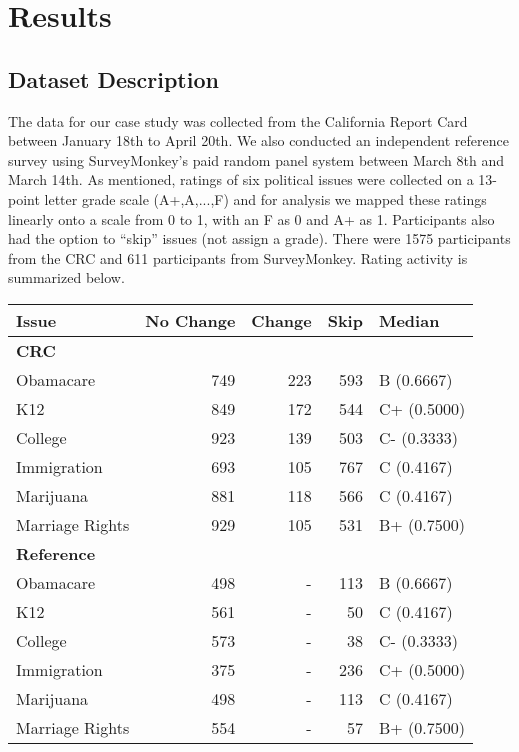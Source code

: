 \section{Results}
\subsection{Dataset Description}
The data for our case study was collected from the California Report Card between January 18th to April 20th.
We also conducted an independent reference survey using SurveyMonkey's paid random panel system between March 8th and March 14th.
As mentioned, ratings of six political issues were collected on a 13-point letter grade scale (A+,A,...,F) and for analysis we 
mapped these ratings linearly onto a scale from 0 to 1, with an F as 0 and A+ as 1.  Participants also had
the option to ``skip'' issues (not assign a grade).
There were 1575 participants from the CRC and 611  participants from SurveyMonkey.  Rating activity is summarized below.

{\centering\scriptsize
\begin{tabular}[!ht]{ l | r | r | r | l }
Issue & No Change & Change & Skip & Median\\
\hline
\hline
  \multicolumn{5}{l}{\textbf{CRC}}\\
  \hline
  Obamacare & 749 & 223 & 593 & B (0.6667) \\
  \hline
  K12 & 849 & 172 & 544 & C+ (0.5000) \\
  \hline
  College & 923 & 139 & 503 & C- (0.3333)\\
  \hline
  Immigration & 693 & 105 & 767 & C (0.4167)\\
  \hline
  Marijuana & 881 & 118 & 566 & C (0.4167) \\
  \hline
  Marriage Rights & 929 & 105 & 531 & B+ (0.7500)\\
\hline
\hline
\multicolumn{5}{l}{\textbf{Reference}}\\
\hline
  Obamacare & 498 & - & 113 & B (0.6667) \\
  \hline
  K12 & 561 & - & 50 & C (0.4167)\\
  \hline
  College & 573 & - & 38 & C- (0.3333)\\
  \hline
  Immigration & 375 & - & 236 & C+ (0.5000) \\
  \hline
  Marijuana & 498 & - & 113 & C (0.4167) \\
  \hline
  Marriage Rights & 554 & - & 57 & B+ (0.7500)
\end{tabular}\\[1\baselineskip]
}

